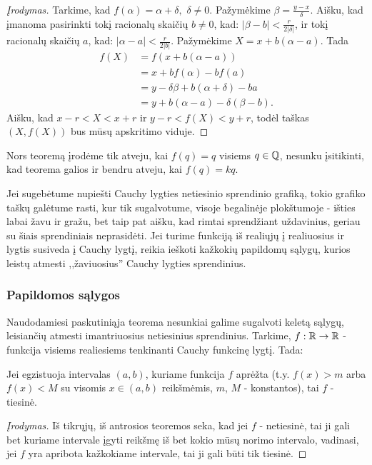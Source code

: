 \begin{proof}[Įrodymas]
  Tarkime, kad $f(\alpha)=\alpha+\delta,$ $\delta\not=0$. Pažymėkime
  $\beta=\frac{y-x}{\delta}$. Aišku, kad įmanoma pasirinkti tokį racionalų
  skaičių $b\not=0$, kad: $|\beta-b|<\frac{r}{2|\delta|}$, ir tokį racionalų
  skaičių $a$, kad: $|\alpha-a|<\frac{r}{2|b|}$. Pažymėkime $X=x+b(\alpha-a)$. Tada
  \begin{align*}
    f(X) & =f(x+b(\alpha-a))\\
    & = x+bf(\alpha)-bf(a)\\
    & = y-\delta\beta+b(\alpha+\delta)-ba\\
    & = y+b(\alpha-a)-\delta(\beta-b).
  \end{align*}
  Aišku, kad $x-r<X<x+r$ ir $y-r<f(X)<y+r$, todėl taškas $(X,f(X))$ bus mūsų
  apskritimo viduje.
\end{proof}

\begin{pastaba}
  Nors teoremą įrodėme tik atveju, kai $f(q)=q$ visiems $q \in \mathbb Q$, nesunku
  įsitikinti, kad teorema galios ir bendru atveju, kai $f(q)=kq$.
\end{pastaba}

Jei sugebėtume nupiešti Cauchy lygties netiesinio sprendinio grafiką, tokio
grafiko taškų galėtume rasti, kur tik sugalvotume, visoje begalinėje
plokštumoje - išties labai žavu ir gražu, bet taip pat aišku, kad rimtai
sprendžiant uždavinius, geriau su šiais sprendiniais neprasidėti. Jei
turime funkciją iš realiųjų į realiuosius ir lygtis susiveda į Cauchy
lygtį, reikia ieškoti kažkokių papildomų sąlygų, kurios leistų atmesti
,,žaviuosius'' Cauchy lygties sprendinius.

\subsubsection{Papildomos sąlygos}
Naudodamiesi paskutiniąja teorema nesunkiai galime sugalvoti keletą sąlygų,
leisiančių atmesti imantriuosius netiesinius sprendinius. Tarkime,
$f:\mathbb R\rightarrow\mathbb R$ - funkcija visiems realiesiems tenkinanti Cauchy
funkcinę lygtį. Tada:

\begin{thm}
  Jei egzistuoja intervalas $(a,b)$, kuriame funkcija $f$ aprėžta (t.y.
  $f(x)>m$ arba $f(x)<M$ su visomis $x\in(a,b)$ reikšmėmis, $m$, $M$ -
  konstantos), tai $f$ - tiesinė.
\end{thm}

\begin{proof}[Įrodymas]
  Iš tikrųjų, iš antrosios teoremos seka, kad jei $f$ - netiesinė, tai ji
  gali bet kuriame intervale įgyti reikšmę iš bet kokio mūsų norimo
  intervalo, vadinasi, jei $f$ yra apribota kažkokiame intervale, tai ji gali
  būti tik tiesinė.
\end{proof}

